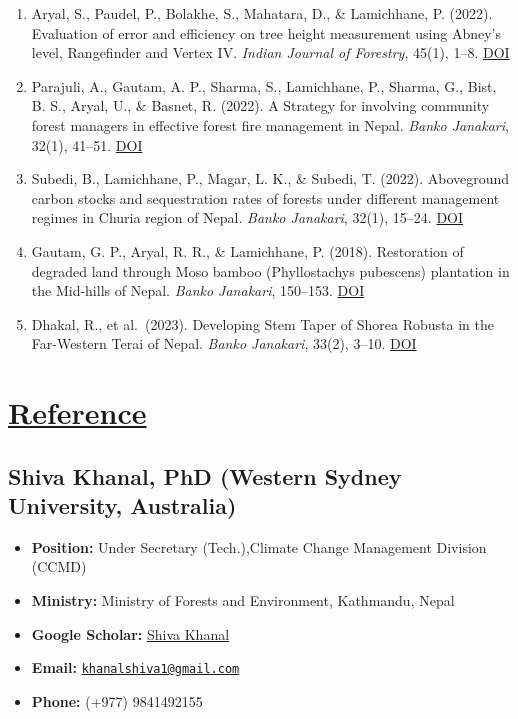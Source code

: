 \documentclass[
]{article}
\providecommand{\tightlist}{%
  \setlength{\itemsep}{0pt}\setlength{\parskip}{0pt}}
\begin{document}
\begin{enumerate}
\def\labelenumi{\arabic{enumi}.}
\tightlist
\item
  Aryal, S., Paudel, P., Bolakhe, S., Mahatara, D., \& Lamichhane, P.
  (2022). Evaluation of error and efficiency on tree height measurement
  using Abney's level, Rangefinder and Vertex IV. \emph{Indian Journal
  of Forestry}, 45(1), 1--8.
  \href{https://doi.org/10.54207/bsmps1000-2022-49P4F8}{DOI}
\item
  Parajuli, A., Gautam, A. P., Sharma, S., Lamichhane, P., Sharma, G.,
  Bist, B. S., Aryal, U., \& Basnet, R. (2022). A Strategy for involving
  community forest managers in effective forest fire management in
  Nepal. \emph{Banko Janakari}, 32(1), 41--51.
  \href{https://doi.org/10.3126/banko.v32i1.45476}{DOI}
\item
  Subedi, B., Lamichhane, P., Magar, L. K., \& Subedi, T. (2022).
  Aboveground carbon stocks and sequestration rates of forests under
  different management regimes in Churia region of Nepal. \emph{Banko
  Janakari}, 32(1), 15--24.
  \href{https://doi.org/10.3126/banko.v32i1.45442}{DOI}
\item
  Gautam, G. P., Aryal, R. R., \& Lamichhane, P. (2018). Restoration of
  degraded land through Moso bamboo (Phyllostachys pubescens) plantation
  in the Mid-hills of Nepal. \emph{Banko Janakari}, 150--153.
  \href{https://doi.org/10.3126/banko.v27i3.20560}{DOI}
\item
  Dhakal, R., et al.~(2023). Developing Stem Taper of Shorea Robusta in
  the Far-Western Terai of Nepal. \emph{Banko Janakari}, 33(2), 3--10.
  \href{https://doi.org/10.3126/banko.v33i2.58809}{DOI}
\end{enumerate}

\section{\texorpdfstring{\underline{Reference}}{}}\label{section-9}

\subsection{Shiva Khanal, PhD (Western Sydney University,
Australia)}\label{shiva-khanal-phd-western-sydney-university-australia}

\begin{itemize}
\tightlist
\item
  \textbf{Position:} Under Secretary (Tech.),Climate Change Management
  Division (CCMD)
\item
  \textbf{Ministry:} Ministry of Forests and Environment, Kathmandu,
  Nepal
\item
  \textbf{Google Scholar:}
  \href{https://scholar.google.com/citations?user=XXXXXXXXXXXX}{Shiva
  Khanal}
\item
  \textbf{Email:}
  \href{mailto:khanalshiva1@gmail.com}{\nolinkurl{khanalshiva1@gmail.com}}
\item
  \textbf{Phone:} (+977) 9841492155
\end{itemize}
\end{document}
